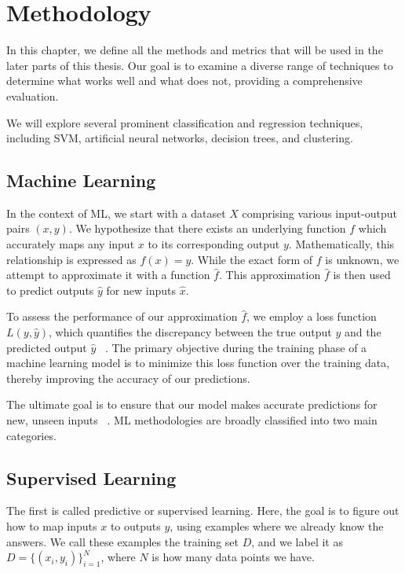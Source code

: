 \chapter{Methodology}
\label{cha:methods}
In this chapter, we define all the methods and metrics that will be used in the later parts of this thesis. Our goal is to examine a diverse range of techniques to determine what works well and what does not, providing a comprehensive evaluation.

We will explore several prominent classification and regression techniques, including SVM, artificial neural networks, decision trees, and clustering. 

\section{Machine Learning}

In the context of ML, we start with a dataset \( X \) comprising various input-output pairs \((x, y)\). We hypothesize that there exists an underlying function \( f \) which accurately maps any input \( x \) to its corresponding output \( y \). Mathematically, this relationship is expressed as \( f(x) = y \). While the exact form of \( f \) is unknown, we attempt to approximate it with a function \( \hat{f} \). This approximation \( \hat{f} \) is then used to predict outputs \( \hat{y} \) for new inputs \( \hat{x} \).

To assess the performance of our approximation \( \hat{f} \), we employ a loss function \( L(y, \hat{y}) \), which quantifies the discrepancy between the true output \( y \) and the predicted output \( \hat{y} \) ~\cite{murphy2013machine}. The primary objective during the training phase of a machine learning model is to minimize this loss function over the training data, thereby improving the accuracy of our predictions.

The ultimate goal is to ensure that our model makes accurate predictions for new, unseen inputs ~\cite{murphy2013machine}. ML methodologies are broadly classified into two main categories.

\section{Supervised Learning}
The first is called predictive or supervised learning. Here, the goal is to figure out how to map inputs $x$ to outputs $y$, using examples where we already know the answers. We call these examples the training set $D$, and we label it as 
$D = \{(x_i, y_i)\}_{i=1}^N$,
where $N$ is how many data points we have.

